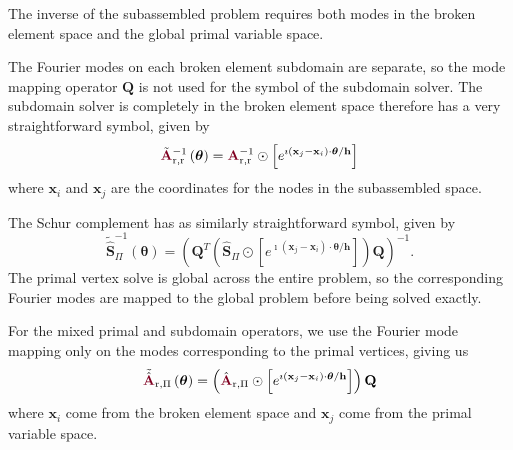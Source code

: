 The inverse of the subassembled problem requires both modes in the broken element space and the global primal variable space.

The Fourier modes on each broken element subdomain are separate, so the mode mapping operator $\mathbf{Q}$ is not used for the symbol of the subdomain solver.
The subdomain solver is completely in the broken element space therefore has a very straightforward symbol, given by
\begin{equation}
\tilde{\color{burgundy}\mathbf{A}}_{\text{r}, \text{r}}^{-1} \left( \boldsymbol{\theta} \right) = {\color{burgundy}\mathbf{A}}_{\text{r}, \text{r}}^{-1} \odot \left[ e^{\imath \left( \mathbf{x}_j - \mathbf{x}_i \right) \cdot \boldsymbol{\theta} / \mathbf{h}} \right]
\end{equation}
where $\mathbf{x}_i$ and $\mathbf{x}_j$ are the coordinates for the nodes in the subassembled space.

The Schur complement has as similarly straightforward symbol, given by
\begin{equation}
\tilde{\hat{\mathbf{S}}}_{\Pi}^{-1} \left( \boldsymbol{\theta} \right) = \left( \mathbf{Q}^T \left( \hat{\mathbf{S}}_{\Pi} \odot \left[ e^{\imath \left( \mathbf{x}_j - \mathbf{x}_i \right) \cdot \boldsymbol{\theta} / \mathbf{h}} \right] \right) \mathbf{Q} \right)^{-1}.
\end{equation}
The primal vertex solve is global across the entire problem, so the corresponding Fourier modes are mapped to the global problem before being solved exactly.

For the mixed primal and subdomain operators, we use the Fourier mode mapping only on the modes corresponding to the primal vertices, giving us
\begin{equation}
\tilde{\hat{\color{burgundy}\mathbf{A}}}\color{black}_{\text{r}, \Pi} \left( \boldsymbol{\theta} \right) = \left( \hat{\color{burgundy}\mathbf{A}}_{\text{r}, \Pi} \odot \left[ e^{\imath \left( \mathbf{x}_j - \mathbf{x}_i \right) \cdot \boldsymbol{\theta} / \mathbf{h}} \right] \right) \mathbf{Q}
\end{equation}
where $\mathbf{x}_i$ come from the broken element space and $\mathbf{x}_j$ come from the primal variable space.

